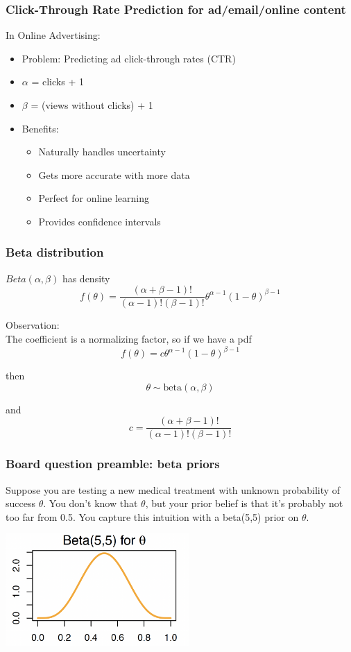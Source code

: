 \documentclass[12pt]{beamer}
\begin{document}
\begin{frame}
	\frametitle{Click-Through Rate Prediction for ad/email/online content}
	In Online Advertising:
	\begin{itemize}[label={\color{blue}$\blacktriangleright$}]
		\item Problem: Predicting ad click-through rates (CTR)
		\item $\alpha$ = clicks + 1
		\item $\beta$ = (views without clicks) + 1
		\item Benefits:
		\begin{itemize}[label={\color{blue}$\blacktriangleright$}]
			\item Naturally handles uncertainty
			\item Gets more accurate with more data
			\item Perfect for online learning
			\item Provides confidence intervals
		\end{itemize}
	\end{itemize}
\end{frame}

\begin{frame}
	\frametitle{Beta distribution}
	
	$Beta(\alpha,\beta)$ has density
	\[ f(\theta) = \frac{(\alpha+\beta-1)!}{(\alpha-1)!(\beta-1)!}\theta^{\alpha-1}(1-\theta)^{\beta-1} \]

	
	Observation:\\
	The coefficient is a normalizing factor, so if we have a pdf
	\[ f(\theta) = c\theta^{\alpha-1}(1-\theta)^{\beta-1} \]
	
	then
	\[ \theta \sim \text{beta}(\alpha,\beta) \]
	
	and
	\[ c = \frac{(\alpha+\beta-1)!}{(\alpha-1)!(\beta-1)!} \]
	
\end{frame}
\begin{frame}
	\frametitle{Board question preamble: beta priors}
	
	Suppose you are testing a new medical treatment with unknown probability of success $\theta$. You don't know that $\theta$, but your prior belief is that it's probably not too far from 0.5. You capture this intuition with a beta(5,5) prior on $\theta$.
	\begin{center}
		\includegraphics[width=7cm]{beta.png}
	\end{center}	

\end{frame}
\end{document}
